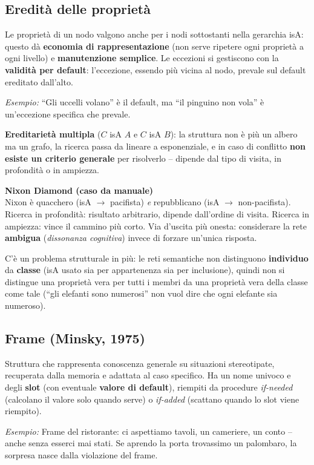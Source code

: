 \documentclass[11pt,a4paper]{article}
\newcommand{\formula}[2]{\begin{formulabox}\textbf{#1}\\[3pt]#2\end{formulabox}}
\newcommand{\es}[1]{\begin{esbox}\textit{Esempio:} #1\end{esbox}}
\begin{document}
\subsection*{Eredit\`a delle propriet\`a}
Le propriet\`a di un nodo valgono anche per i nodi sottostanti nella gerarchia isA: questo d\`a \textbf{economia di rappresentazione} (non serve ripetere ogni propriet\`a a ogni livello) e \textbf{manutenzione semplice}. Le eccezioni si gestiscono con la \textbf{validit\`a per default}: l'eccezione, essendo pi\`u vicina al nodo, prevale sul default ereditato dall'alto.
\es{``Gli uccelli volano'' \`e il default, ma ``il pinguino non vola'' \`e un'eccezione specifica che prevale.}

\textbf{Ereditariet\`a multipla} ($C$ isA $A$ e $C$ isA $B$): la struttura non \`e pi\`u un albero ma un grafo, la ricerca passa da lineare a esponenziale, e in caso di conflitto \textbf{non esiste un criterio generale} per risolverlo -- dipende dal tipo di visita, in profondit\`a o in ampiezza.

\formula{Nixon Diamond (caso da manuale)}{Nixon \`e quacchero (isA $\to$ pacifista) \emph{e} repubblicano (isA $\to$ non-pacifista). Ricerca in profondit\`a: risultato arbitrario, dipende dall'ordine di visita. Ricerca in ampiezza: vince il cammino pi\`u corto. Via d'uscita pi\`u onesta: considerare la rete \textbf{ambigua} (\emph{dissonanza cognitiva}) invece di forzare un'unica risposta.}

C'\`e un problema strutturale in pi\`u: le reti semantiche non distinguono \textbf{individuo} da \textbf{classe} (isA usato sia per appartenenza sia per inclusione), quindi non si distingue una propriet\`a vera per tutti i membri da una propriet\`a vera della classe come tale (``gli elefanti sono numerosi'' non vuol dire che ogni elefante sia numeroso).

\subsection*{Frame (Minsky, 1975)}
Struttura che rappresenta conoscenza generale su situazioni stereotipate, recuperata dalla memoria e adattata al caso specifico. Ha un nome univoco e degli \textbf{slot} (con eventuale \textbf{valore di default}), riempiti da procedure \emph{if-needed} (calcolano il valore solo quando serve) o \emph{if-added} (scattano quando lo slot viene riempito).
\es{Frame del ristorante: ci aspettiamo tavoli, un cameriere, un conto -- anche senza esserci mai stati. Se aprendo la porta trovassimo un palombaro, la sorpresa nasce dalla violazione del frame.}
\end{document}
